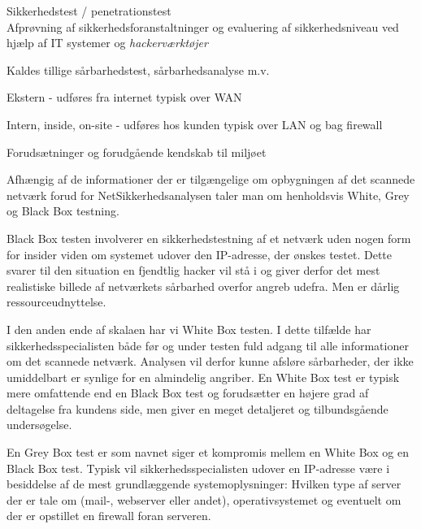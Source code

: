 \documentclass[20pt,landscape,a4paper,footrule]{foils}
\begin{document}
\begin{list1}
\item Sikkerhedstest / penetrationstest\\
Afprøvning af sikkerhedsforanstaltninger og evaluering af
sikkerhedsniveau ved hjælp af IT systemer og \emph{hackerværktøjer}  
\item Kaldes tillige sårbarhedstest, sårbarhedsanalyse m.v.
\item Ekstern - udføres fra internet typisk over WAN
\item Intern, inside, on-site - udføres hos kunden typisk over LAN og
  bag firewall
\end{list1}



\begin{list1}
\item Forudsætninger og forudgående kendskab til miljøet
\item 
Afhængig af de informationer der er tilgængelige om opbygningen af det
scannede netværk forud for NetSikkerhedsanalysen taler man om
henholdsvis White, Grey og Black Box testning. 
\begin{list2}
\item Black Box testen involverer en sikkerhedstestning af et netværk uden
nogen form for insider viden om systemet udover den IP-adresse, der
ønskes testet. Dette svarer til den situation en fjendtlig hacker vil
stå i og giver derfor det mest realistiske billede af netværkets
sårbarhed overfor angreb udefra. Men er dårlig ressourceudnyttelse.  

\item I den anden ende  af skalaen har vi White Box testen. I dette tilfælde
har sikkerhedsspecialisten både før og under testen fuld adgang til
alle informationer om det scannede netværk. Analysen vil derfor kunne
afsløre sårbarheder, der ikke umiddelbart er synlige for en almindelig
angriber. En White Box test er typisk mere omfattende end en Black Box
test og forudsætter en højere grad af deltagelse fra kundens side, men
giver en meget detaljeret og tilbundsgående undersøgelse.  

\item En Grey Box test er som navnet siger et kompromis mellem en White Box
og en Black Box test. Typisk vil sikkerhedsspecialisten udover en
IP-adresse være i besiddelse af de mest grundlæggende
systemoplysninger: Hvilken type af server der er tale om (mail-,
webserver eller andet), operativsystemet og eventuelt om der er
opstillet en firewall foran serveren. 
\end{list2}
\end{list1}
\end{document}
